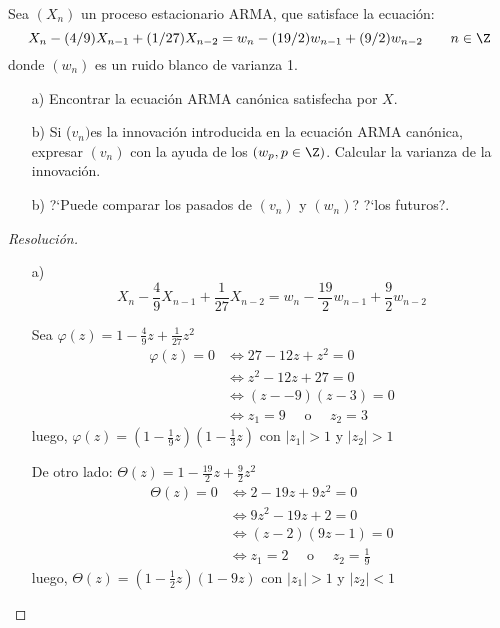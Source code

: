 \begin{ejemplo}
Sea $(X_{{n}})$ un proceso estacionario ARMA, que satisface la ecuaci\'{o}n:
\[
X_{n} -(4/9) X_{n-1} +(1/27) X_{n-2} =w_{n} -(19/2) w_{n-1} 
+(9/2) w_{n-2} \quad \quad n\in \Z
\]
donde $(w_{n})$ es un ruido blanco de varianza 1.

\begin{enumerate}
\item[a)] Encontrar la ecuaci\'{o}n ARMA can\'{o}nica satisfecha por $X$.
\item[b)] Si ($v_{n}) $es la innovaci\'{o}n introducida en la ecuaci\'{o}n ARMA can\'{o}nica, expresar $(v_{n})$ con la ayuda de los $(w_{p}, p\in \Z)$. Calcular la varianza de la innovaci\'{o}n.
\item[b)] ?`Puede comparar los pasados de $(v_{n})$ y $(w_{n})$? ?`los futuros?.
\end{enumerate}

\begin{proof}[Resoluci\'{o}n]
\quad 
\begin{enumerate}
\item[a)]
\begin{equation}\label{eq:ej12.1}
X_{n} -\frac{4}{9}X_{n-1} +\frac{1}{27}X_{n-2} =w_{n} 
-\frac{19}{2}w_{n-1} +\frac{9}{2}w_{n-2}  
\end{equation}

Sea $\varphi (z)=1-\frac{4}{9}z+\frac{1}{27}z^{2}$
\begin{align*}
 \varphi (z)=0
	&\Longleftrightarrow 27-12z+z^{2}=0\\
	&\Longleftrightarrow z^{2}-12 z+27=0\\
	&\Longleftrightarrow (z-- 9) (z - 3)=0\\
	&\Longleftrightarrow z_{1}= 9\quad\text{ o }\quad z_{2}= 3
\end{align*}
luego, $\varphi (z)=\left( {1-\frac{1}{9}z} \right)\left({1-\frac{1}{3}z} \right)$
con $\left| {z_{1} } \right|>1$ y $\left| {z_{2} } \right|>1$

De otro lado: $\Theta (z)=1-\frac{19}{2}z+\frac{9}{2}z^{2}$
\begin{align*}
 \Theta \left( z \right)=0
	&\Longleftrightarrow 2-19z+9z^{2}=0\\
	&\Longleftrightarrow 9 z^{2}-19 z+2=0\\
	&\Longleftrightarrow (z - 2) (9z - 1)=0\\
	&\Longleftrightarrow z_{1}= 2\quad\text{ o }\quad z_{2}=\frac{1}{9}
\end{align*}
luego, $\Theta (z)=\left( {1-\frac{1}{2}z} \right)\left( {1-9 z} \right)$ 
con $\left| {z_{1} } \right|>1$ y $\left| {z_{2} } \right|<1$


\end{enumerate}
\end{proof}
\end{ejemplo}
